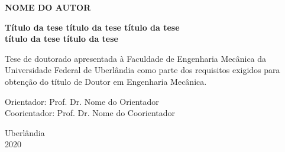 \clearpage
\thispagestyle{fancy}
\fancyhf{}
\vspace*{2.5cm}
\begin{center}
	
	{\large \textbf{NOME DO AUTOR}}
	
	\vspace*{2.8cm}
	{\fontsize{23}{23} \textbf{Título da tese título da tese título da tese}}	\\ \vspace{1.2ex}
	{\fontsize{23}{23} \textbf{título da tese título da tese}}\\ \vspace{1.2ex}
\end{center}

\vspace*{2.5cm}
\begin{flushright}
	\parbox{3.5in}{ Tese de doutorado apresentada à Faculdade de 
		Engenharia Mecânica da Universidade Federal de Uberlândia como parte dos requisitos exigidos para 
		obtenção do título de Doutor em Engenharia Mecânica.}
\end{flushright}

\vspace{1.0cm}
\noindent
Orientador: Prof. Dr. Nome do Orientador\\
\noindent
Coorientador: Prof. Dr. Nome do Coorientador\\

\vspace{6.5cm}
\begin{center}
	Uberlândia\\2020
\end{center}
